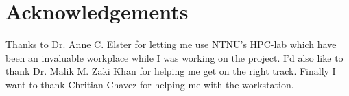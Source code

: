 \section*{Acknowledgements}

Thanks to Dr. Anne C. Elster for letting me use NTNU's HPC-lab which have been an 
invaluable workplace while I was working on the project. I'd also like to thank
Dr. Malik M. Zaki Khan for helping me get on the right track. Finally I want to
thank Chritian Chavez for helping me with the workstation.